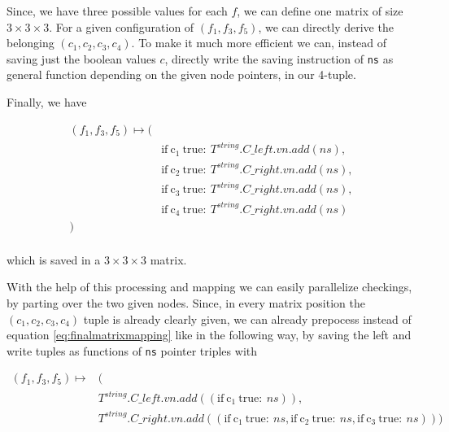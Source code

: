 \documentclass{article}
\newtheorem*{theorem A}{Theorem A}
\newtheorem*{theorem B}{N\"olker's Theorem}
\theoremstyle{remark}
\theoremstyle{remark}
\begin{document}
Since, we have three possible values for each $f$, we can define one matrix of size $3 \times 3 \times 3$. For a given configuration of $\left(f_{1}, f_{3}, f_{5}\right)$, we can directly derive the belonging $\left(c_{1}, c_{2}, c_{3}, c_{4}\right)$. To make it much more efficient we can, instead of saving just the boolean values $c$, directly write the saving instruction of \texttt{ns} as general function depending on the given node pointers, in our 4-tuple.

Finally, we have

\begin{equation}
    \begin{split}
        \left(f_{1}, f_{3}, f_{5}\right) \mapsto (&\\
            & \mathrm{if \ c_{1} \ true:} \ T^{string}.C\_left.vn.add\left(ns\right),\\
            & \mathrm{if \ c_{2} \ true:} \ T^{string}.C\_right.vn.add\left(ns\right),\\
            & \mathrm{if \ c_{3} \ true:} \ T^{string}.C\_right.vn.add\left(ns\right),\\
            & \mathrm{if \ c_{4} \ true:} \ T^{string}.C\_right.vn.add\left(ns\right)\\
            )\\
    \end{split}
\label{eq:finalmatrixmapping}
\end{equation}

which is saved in a $3 \times 3 \times 3$ matrix.

With the help of this processing and mapping we can easily parallelize checkings, by parting over the two given nodes. Since, in every matrix position the $\left(c_{1}, c_{2}, c_{3}, c_{4}\right)$ tuple is already clearly given, we can already prepocess instead of equation \ref{eq:finalmatrixmapping} like in the following way, by saving the left and write tuples as functions of \texttt{ns} pointer triples with 

\begin{equation}
    \begin{split}
        \left(f_{1}, f_{3}, f_{5}\right) \mapsto &(\\
            & T^{string}.C\_left.vn.add\left(\left(\mathrm{if \ c_{1} \ true:} \ ns\right)\right),\\
            & T^{string}.C\_right.vn.add\left(\left(\mathrm{if \ c_{1} \ true:} \ ns, \mathrm{if \ c_{2} \ true:} \ ns, \mathrm{if \ c_{3} \ true:} \ ns\right)\right)
            )\\
    \end{split}
\label{eq:finalmatrixmapping_v2}
\end{equation}
\end{document}
